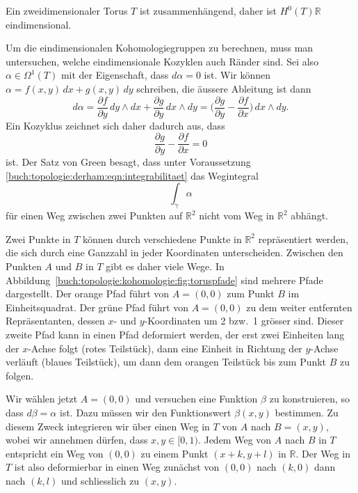 Ein zweidimensionaler Torus $T$ ist zusammenhängend, daher ist
$H^0(T)\mathbb{R}$ eindimensional.

Um die eindimensionalen Kohomologiegruppen zu berechnen, muss man
untersuchen, welche eindimensionale Kozyklen auch Ränder sind.
Sei also $\alpha\in \Omega^1(T)$ mit der Eigenschaft, dass $d\alpha=0$
ist.
Wir können $\alpha = f(x,y)\,dx + g(x,y)\,dy$ schreiben, die äussere Ableitung
ist dann
\[
d\alpha
=
\frac{\partial f}{\partial y}\,dy\wedge dx
+
\frac{\partial g}{\partial y}\,dx\wedge dy
=
\biggl(\frac{\partial g}{\partial y}-\frac{\partial f}{\partial x}\biggr)
\,dx\wedge dy.
\]
Ein Kozyklus zeichnet sich daher dadurch aus, dass
\begin{equation}
\frac{\partial g}{\partial y}-\frac{\partial f}{\partial x}
=
0
\label{buch:topologie:derham:eqn:integrabilitaet}
\end{equation}
ist.
Der Satz von Green besagt, dass unter Voraussetzung
\eqref{buch:topologie:derham:eqn:integrabilitaet}
das Wegintegral
\[
\int_\gamma \alpha
\]
für einen Weg zwischen zwei Punkten auf $\mathbb{R}^2$ nicht vom Weg
in $\mathbb{R}^2$ abhängt.

Zwei Punkte in $T$ können durch verschiedene Punkte in
$\mathbb{R}^2$ repräsentiert werden, die sich durch eine Ganzzahl
in jeder Koordinaten unterscheiden.
Zwischen den Punkten $A$ und $B$ in $T$ gibt es daher viele Wege.
In Abbildung~\ref{buch:topologie:kohomologie:fig:toruspfade} sind
mehrere Pfade dargestellt.
Der orange Pfad führt von $A=(0,0)$ zum Punkt $B$ im Einheitsquadrat.
Der grüne Pfad führt von $A=(0,0)$ zu dem weiter entfernten
Repräsentanten, dessen $x$- und $y$-Koordinaten um 2 bzw.~1 grösser
sind.
Dieser zweite Pfad kann in einen Pfad deformiert werden, der erst
zwei Einheiten lang der $x$-Achse folgt ({\color{darkred}rotes}
Teilstück), dann eine Einheit in Richtung der $y$-Achse verläuft
({\color{blue}blaues} Teilstück), um dann dem {\color{orange}orangen}
Teilstück bis zum Punkt $B$ zu folgen.

Wir wählen jetzt $A=(0,0)$ und versuchen eine Funktion $\beta$ zu
konstruieren, so dass $d\beta =\alpha$ ist.
Dazu müssen wir den Funktionswert $\beta(x,y)$ bestimmen.
Zu diesem Zweck integrieren wir über einen Weg in $T$ von $A$ nach
$B=(x,y)$, wobei wir annehmen dürfen, dass $x,y\in[0,1)$.
Jedem Weg von $A$ nach $B$ in $T$ entspricht ein Weg von $(0,0)$
zu einem Punkt $(x+k,y+l)$ in $\mathbb{R}$.
Der Weg in $T$ ist also deformierbar in einen Weg
zunächst von $(0,0)$ nach $(k,0)$ dann nach $(k,l)$ und schliesslich
zu $(x,y)$.


